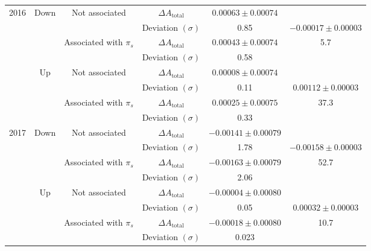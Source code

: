 \documentclass{article}
\begin{document}
\begin{center}
\begin{tabular}{c|c|c|c|c|c}
                        \multirow{8}{*}{2016} & \multirow{4}{*}{Down} & \multirow{2}{*}{Not associated} & $\Delta A_\text{total}$ & $0.00063 \pm 0.00074$& \\
                        & & & Deviation $(\sigma)$ & 0.85& $-0.00017\pm 0.00003$\\
                        \cline{3-5}
                        & & \multirow{2}{*}{Associated with $\pi_s$} & $\Delta A_\text{total}$ & $0.00043\pm 0.00074$ &  5.7\\
                        & & & Deviation $(\sigma)$ & 0.58 &  \\
                        \cline{2-6}
                        & \multirow{4}{*}{Up} & \multirow{2}{*}{Not associated} & $\Delta A_\text{total}$ & $0.00008\pm 0.00074$& \\
                        & & & Deviation $(\sigma)$ &0.11 & $0.00112 \pm 0.00003$\\
                        \cline{3-5}
                        & & \multirow{2}{*}{Associated with $\pi_s$} & $\Delta A_\text{total}$ & $0.00025\pm 0.00075$& 37.3\\
                        & & & Deviation $(\sigma)$ &0.33 & \\
                        \hline

                        \multirow{8}{*}{2017} & \multirow{4}{*}{Down} & \multirow{2}{*}{Not associated} & $\Delta A_\text{total}$ & $-0.00141\pm 0.00079$& \\
                        & & & Deviation $(\sigma)$ &1.78 &$-0.00158\pm0.00003$ \\
                        \cline{3-5}
                        & & \multirow{2}{*}{Associated with $\pi_s$} & $\Delta A_\text{total}$ & $-0.00163\pm 0.00079$& 52.7 \\
                        & & & Deviation $(\sigma)$ & 2.06& \\
                        \cline{2-6}
                        & \multirow{4}{*}{Up} & \multirow{2}{*}{Not associated} & $\Delta A_\text{total}$ & $-0.00004\pm 0.00080$& \\
                        & & & Deviation $(\sigma)$ & 0.05& $0.00032\pm0.00003$ \\
                        \cline{3-5}
                        & & \multirow{2}{*}{Associated with $\pi_s$} & $\Delta A_\text{total}$ & $-0.00018\pm 0.00080$& 10.7\\
                        & & & Deviation $(\sigma)$ &0.023 & \\
                        \hline


\end{tabular}
\end{center}
\end{document}
